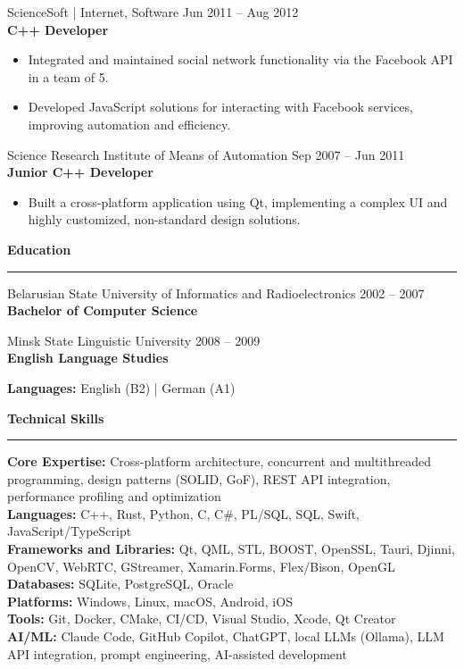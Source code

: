\documentclass[10pt, a4paper]{article}
\newcommand{\heading}[1]{%
    \vspace{4pt}%
    \begin{center}{\color{accent}\large\bfseries #1}\end{center}%
    \vspace{-8pt}%
    \textcolor{accent}{\rule{\textwidth}{0.4pt}}%
    \vspace{4pt}%
}
\newcommand{\roleentry}[3]{%
    \vspace{8pt}%
    {\normalsize #1 \hfill {\small\color{graytext}#3}}\\[1pt]%
    {\textbf{#2}}%
    \vspace{1pt}%
}
\begin{document}
\roleentry{ScienceSoft | Internet, Software}{C++ Developer}{Jun 2011 -- Aug 2012}
\begin{itemize}
    \item Integrated and maintained social network functionality via the Facebook API in a team of 5.
    \item Developed JavaScript solutions for interacting with Facebook services, improving automation and efficiency.
\end{itemize}

\roleentry{Science Research Institute of Means of Automation}{Junior C++ Developer}{Sep 2007 -- Jun 2011}
\begin{itemize}
    \item Built a cross-platform application using Qt, implementing a complex UI and highly customized, non-standard design solutions.
\end{itemize}

\heading{Education}

\roleentry{Belarusian State University of Informatics and Radioelectronics}{Bachelor of Computer Science}{2002 -- 2007}

\roleentry{Minsk State Linguistic University}{English Language Studies}{2008 -- 2009}

\vspace{4pt}
\noindent\small\textbf{Languages:} English (B2) | German (A1)

\heading{Technical Skills}

\noindent
\textbf{Core Expertise:} Cross-platform architecture, concurrent and multithreaded programming, design patterns (SOLID, GoF), REST API integration, performance profiling and optimization\\[2pt]
\textbf{Languages:} C++, Rust, Python, C, C\#, PL/SQL, SQL, Swift, JavaScript/TypeScript\\[2pt]
\textbf{Frameworks and Libraries:} Qt, QML, STL, BOOST, OpenSSL, Tauri, Djinni, OpenCV, WebRTC, GStreamer, Xamarin.Forms, Flex/Bison, OpenGL\\[2pt]
\textbf{Databases:} SQLite, PostgreSQL, Oracle\\[2pt]
\textbf{Platforms:} Windows, Linux, macOS, Android, iOS\\[2pt]
\textbf{Tools:} Git, Docker, CMake, CI/CD, Visual Studio, Xcode, Qt Creator\\[2pt]
\textbf{AI/ML:} Claude Code, GitHub Copilot, ChatGPT, local LLMs (Ollama), LLM API integration, prompt engineering, AI-assisted development
\end{document}
